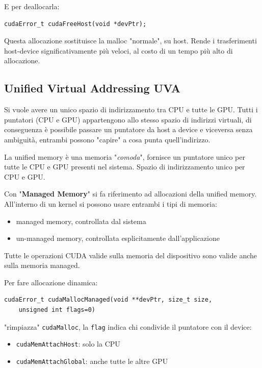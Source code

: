 E per deallocarla:
\begin{verbatim}
cudaError_t cudaFreeHost(void *devPtr);
\end{verbatim}

Questa allocazione sostituisce la malloc "normale", su host. Rende i trasferimenti host-device significativamente più veloci, al costo di un tempo più alto di allocazione.

\subsection{Unified Virtual Addressing UVA}

Si vuole avere un unico spazio di indirizzamento tra CPU e tutte le GPU. Tutti i puntatori (CPU e GPU) appartengono allo stesso spazio di indirizzi virtuali, di conseguenza è possibile passare un puntatore da host a device e viceversa senza ambiguità, entrambi possono "capire" a cosa punta quell'indirizzo.


La unified memory è una memoria "\textit{comoda}", fornisce un puntatore unico per tutte le CPU e GPU presenti nel sistema. Spazio di indirizzamento unico per CPU e GPU.

Con "\textbf{Managed Memory}" si fa riferimento ad allocazioni della unified memory. All'interno di un kernel si possono usare entrambi i tipi di memoria: 
\begin{itemize}
	\item managed memory, controllata dal sistema
    
	\item un-managed memory, controllata esplicitamente dall'applicazione
\end{itemize}

Tutte le operazioni CUDA valide sulla memoria del dispositivo sono valide anche sulla memoria managed.

Per fare allocazione dinamica:
\begin{verbatim}
cudaError_t cudaMallocManaged(void **devPtr, size_t size, 
    unsigned int flags=0)
\end{verbatim}

"rimpiazza" \texttt{cudaMalloc}, la \texttt{flag} indica chi condivide il puntatore con il device:
\begin{itemize}
	\item \texttt{cudaMemAttachHost}: solo la CPU
    
	\item \texttt{cudaMemAttachGlobal}: anche tutte le altre GPU
\end{itemize}

